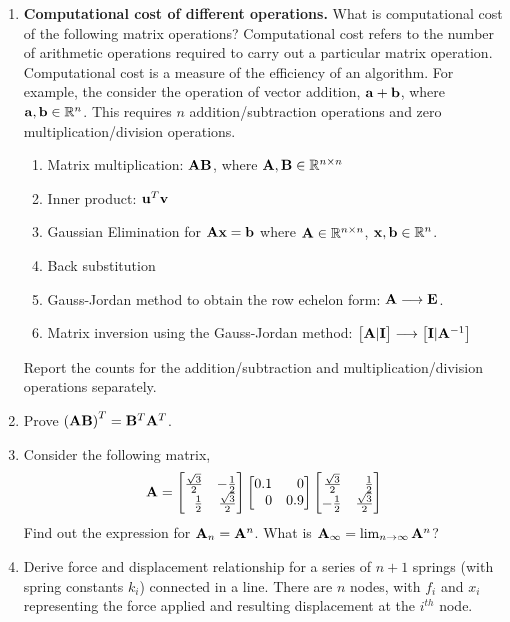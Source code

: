 \documentclass[9pt]{article}
\def\mf{\ensuremath\mathbf}
\def\mb{\ensuremath\mathbb}
\def\lp{\ensuremath\left(}
\def\rp{\ensuremath\right)}
\def\bmx{\ensuremath\begin{bmatrix*}[r]}
\def\emx{\ensuremath\end{bmatrix*}}
\newcommand{\ct}[1]{\lp #1\rp}
\begin{document}
\begin{multicols}{2}
\begin{enumerate}
    \item \textbf{Computational cost of different operations.} What is computational cost of the following matrix operations? Computational cost refers to the number of arithmetic operations  required to carry out a particular matrix operation. Computational cost is a measure of the efficiency of an algorithm. For example, the consider the operation of vector addition, $\mf{a} + \mf{b}$, where $\mf{a}, \mf{b} \in \mb{R}^n$. This requires $n$ addition/subtraction operations and zero multiplication/division operations.
    \begin{enumerate}
        \item Matrix multiplication: $\mf{AB}$, where $\mf{A}, \mf{B} \in \mb{R}^{n \times n}$
        \item Inner product: $\mf{u}^T\mf{v}$
        \item Gaussian Elimination for $\mf{A}\mf{x} = \mf{b}$ where $\mf{A} \in \mb{R}^{n \times n}$, $\mf{x}, \mf{b} \in \mb{R}^{n}$.
        \item Back substitution
        \item Gauss-Jordan method to obtain the row echelon form: $\mf{A} \longrightarrow \mf{E}$.
        \item Matrix inversion using the Gauss-Jordan method: $\bmx \mf{A} \vert \mf{I} \emx \longrightarrow \bmx \mf{I}\vert\mf{A}^{-1}\emx$
    \end{enumerate} 
    Report the counts for the addition/subtraction and multiplication/division operations separately. 

    \item Prove $\ct{\mf{A}\mf{B}}^T = \mf{B}^T\mf{A}^T$.

    \item Consider the following matrix,
    \[ \mf{A} = \bmx \frac{\sqrt{3}}{2} & -\frac{1}{2}\\\frac{1}{2} & \frac{\sqrt{3}}{2} \emx \bmx 0.1 & 0\\0 & 0.9 \emx \bmx \frac{\sqrt{3}}{2} & \frac{1}{2}\\-\frac{1}{2} & \frac{\sqrt{3}}{2} \emx \]
    Find out the expression for $\mf{A}_n = \mf{A}^n$. What is $\mf{A}_\infty = \lim_{n\to\infty} \mf{A}^n$?

    \item Derive force and displacement relationship for a series of $n+1$ springs (with spring constants $k_i$) connected in a line. There are $n$ nodes, with $f_i$ and $x_i$ representing the force applied and resulting displacement at the $i^{th}$ node. 
    \begin{center}
\end{center}
\end{enumerate}
\end{multicols}
\end{document}
